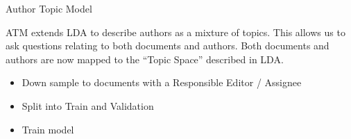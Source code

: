 \documentclass[10pt]{beamer}
\begin{document}
\begin{frame}{Author Topic Model}

  ATM extends LDA to describe authors as a mixture of topics. This allows us to ask questions relating to both documents and authors. Both documents and authors are now mapped to the ``Topic Space'' described in LDA.

  \begin{itemize}
  \item Down sample to documents with a Responsible Editor / Assignee
  \item Split into Train and Validation
  \item Train model
  \end{itemize}

\end{frame}
\end{document}
